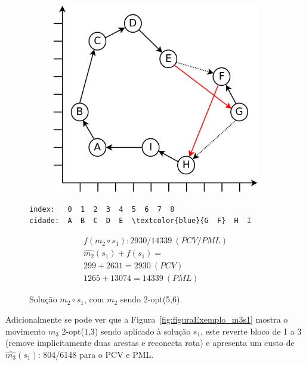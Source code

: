 \begin{figure}[ht]
    \begin{minipage}{.475\textwidth}
        \begin{subfigure}[t]{1\textwidth} %
            \includegraphics[width=1\linewidth]{figuras/pml/exemplo-rodolfo-2opt-5-6.png}
        \end{subfigure}
    \end{minipage}
    \begin{minipage}{.475\textwidth}
\begin{Verbatim}[commandchars=\\\{\}]
index:   0  1  2  3  4  5  6  7  8
cidade:  A  B  C  D  E  \textcolor{blue}{G  F}  H  I
\end{Verbatim}
\begin{gather*}
f(m_2 \circ s_1): 2930/14339 \ (PCV/PML) \\
\widehat{m_2}(s_1)+f(s_1) = \\
299 + 2631 = 2930 \ (PCV) \\
1265 + 13074 = 14339 \ (PML)
\end{gather*}
    \end{minipage}
    \caption{Solução $m_2 \circ s_1$, com $m_2$ sendo 2-opt(5,6).}
    \label{fig:figuraExemplo_m2s1}
\end{figure}

Adicionalmente se pode ver que a Figura~\ref{fig:figuraExemplo_m3s1} mostra o movimento $m_3$ 2-opt(1,3) sendo aplicado à solução $s_1$, este reverte bloco de 1 a 3 (remove implicitamente duas arestas e reconecta rota) e apresenta um custo de $\widehat{m_3}(s_1)$: 804/6148 para o PCV e PML.

